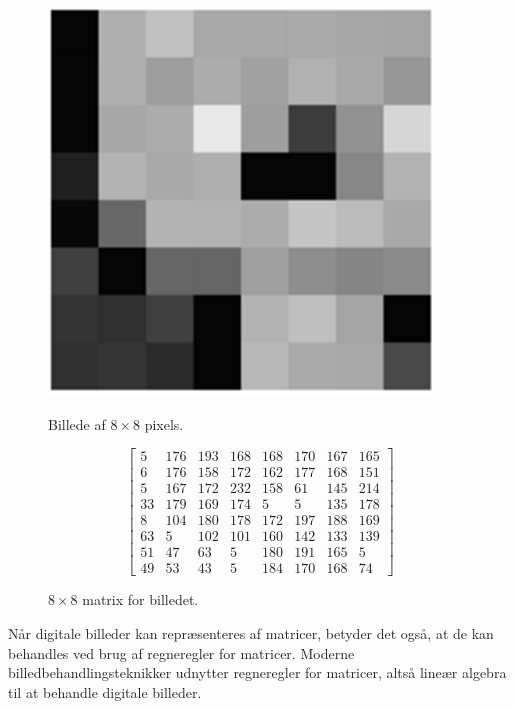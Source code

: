 \begin{figure}[htbp]
\begin{minipage}[b]{0.25\linewidth}
\centering
\includegraphics[width=\textwidth]{Billeder/8x8_blok2.png}
\caption{Billede af $8\times8$ pixels.}
\label{fig:pixelblok}
\end{minipage}
\hspace{0.5cm}
\begin{minipage}[b]{0.5\linewidth}
\centering
\[\begin{bmatrix}
5	&	176	&	193	&	168	&	168	&	170	&	167	&	165\\
6	&	176	&	158	&	172	&	162	&	177	&	168	&	151\\
5	&	167	&	172	&	232	&	158	&	61	&	145	&	214\\
33	&	179	&	169	&	174	&	5	&	5	&	135	&	178\\
8	&	104	&	180	&	178	&	172	&	197	&	188	&	169\\
63	&	5	&	102	&	101	&	160	&	142	&	133	&	139\\
51	&	47	&	63	&	5	&	180	&	191	&	165	&	5\\
49	&	53	&	43	&	5	&	184	&	170	&	168	&	74
\end{bmatrix}
\]
\caption{$8\times8$ matrix for billedet.}
\label{eq:pixelmatrix}
\end{minipage}
\end{figure}
Når digitale billeder kan repræsenteres af matricer, betyder det også, at de kan behandles ved brug af regneregler for matricer. Moderne billedbehandlingsteknikker udnytter regneregler for matricer, altså lineær algebra til at behandle digitale billeder.

